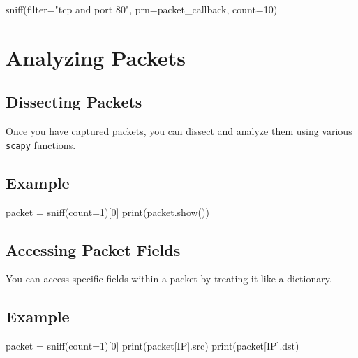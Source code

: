 \documentclass[
  letterpaper,
  DIV=11,
  numbers=noendperiod]{scrreprt}
\newenvironment{Shaded}{\begin{snugshade}}{\end{snugshade}}
\newcommand{\BuiltInTok}[1]{\textcolor[rgb]{0.00,0.23,0.31}{#1}}
\newcommand{\DecValTok}[1]{\textcolor[rgb]{0.68,0.00,0.00}{#1}}
\newcommand{\NormalTok}[1]{\textcolor[rgb]{0.00,0.23,0.31}{#1}}
\newcommand{\OperatorTok}[1]{\textcolor[rgb]{0.37,0.37,0.37}{#1}}
\newcommand{\StringTok}[1]{\textcolor[rgb]{0.13,0.47,0.30}{#1}}
\begin{document}
\begin{Shaded}
\begin{Highlighting}[]
\NormalTok{sniff(}\BuiltInTok{filter}\OperatorTok{=}\StringTok{"tcp and port 80"}\NormalTok{, prn}\OperatorTok{=}\NormalTok{packet\_callback, count}\OperatorTok{=}\DecValTok{10}\NormalTok{)}
\end{Highlighting}
\end{Shaded}

\section{Analyzing Packets}\label{analyzing-packets}

\subsection{Dissecting Packets}\label{dissecting-packets}

Once you have captured packets, you can dissect and analyze them using
various \texttt{scapy} functions.

\subsection{Example}\label{example-23}

\begin{Shaded}
\begin{Highlighting}[]
\NormalTok{packet }\OperatorTok{=}\NormalTok{ sniff(count}\OperatorTok{=}\DecValTok{1}\NormalTok{)[}\DecValTok{0}\NormalTok{]}
\BuiltInTok{print}\NormalTok{(packet.show())}
\end{Highlighting}
\end{Shaded}

\subsection{Accessing Packet Fields}\label{accessing-packet-fields}

You can access specific fields within a packet by treating it like a
dictionary.

\subsection{Example}\label{example-24}

\begin{Shaded}
\begin{Highlighting}[]
\NormalTok{packet }\OperatorTok{=}\NormalTok{ sniff(count}\OperatorTok{=}\DecValTok{1}\NormalTok{)[}\DecValTok{0}\NormalTok{]}
\BuiltInTok{print}\NormalTok{(packet[IP].src)}
\BuiltInTok{print}\NormalTok{(packet[IP].dst)}
\end{Highlighting}
\end{Shaded}
\end{document}

